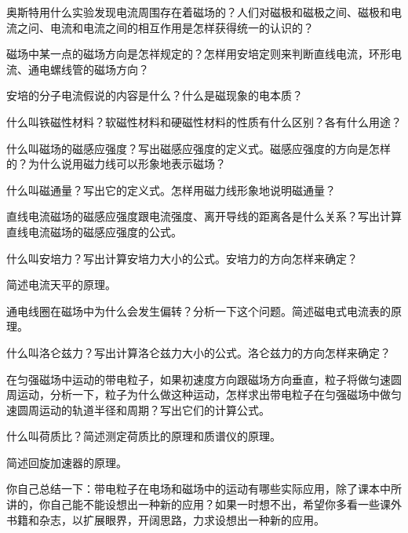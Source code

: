 \begin{Review}
\begin{question}
  \item 奥斯特用什么实验发现电流周围存在着磁场的？人们对磁极和磁极之间、磁极和电流之问、电流和电流之间的相互作用是怎样获得统一的认识的？
  \item 磁场中某一点的磁场方向是怎祥规定的？怎样用安培定则来判断直线电流，环形电流、通电螺线管的磁场方向？
  \item 安培的分子电流假说的内容是什么？什么是磁现象的电本质？
  \item 什么叫铁磁性材料？软磁性材料和硬磁性材料的性质有什么区别？各有什么用途？
  \item 什么叫磁场的磁感应强度？写出磁感应强度的定义式。磁感应强度的方向是怎样的？为什么说用磁力线可以形象地表示磁场？
  \item 什么叫磁通量？写出它的定义式。怎样用磁力线形象地说明磁通量？
  \item 直线电流磁场的磁感应强度跟电流强度、离开导线的距离各是什么关系？写出计算直线电流磁场的磁感应强度的公式。
  \item 什么叫安培力？写出计算安培力大小的公式。安培力的方向怎样来确定？
  \item 简述电流天平的原理。
  \item 通电线圈在磁场中为什么会发生偏转？分析一下这个问题。简述磁电式电流表的原理。
  \item 什么叫洛仑兹力？写出计算洛仑兹力大小的公式。洛仑兹力的方向怎样来确定？
  \item 在匀强磁场中运动的带电粒子，如果初速度方向跟磁场方向垂直，粒子将做匀速圆周运动，分析一下，粒子为什么做这种运动，怎样求出带电粒子在匀强磁场中做匀速圆周运动的轨道半径和周期？写出它们的计算公式。
  \item 什么叫荷质比？简述测定荷质比的原理和质谱仪的原理。
  \item 简述回旋加速器的原理。
  \item 你自己总结一下：带电粒子在电场和磁场中的运动有哪些实际应用，除了课本中所讲的，你自己能不能设想出一种新的应用？如果一时想不出，希望你多看一些课外书籍和杂志，以扩展眼界，开阔思路，力求设想出一种新的应用。
\end{question}
\end{Review}

